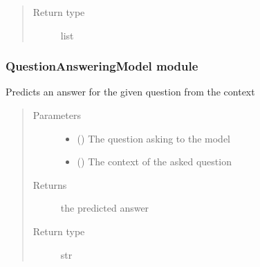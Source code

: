 \documentclass[letterpaper,10pt,english]{sphinxmanual}
\begin{document}
\begin{fulllineitems}
\begin{fulllineitems}
\begin{quote}
\begin{description}
\item[{Return type}] \leavevmode
\sphinxAtStartPar
list

\end{description}\end{quote}

\end{fulllineitems}


\end{fulllineitems}


\sphinxstepscope


\subsubsection{QuestionAnsweringModel module}
\label{\detokenize{QuestionAnsweringModel:module-QuestionAnsweringModel}}\label{\detokenize{QuestionAnsweringModel:questionansweringmodel-module}}\label{\detokenize{QuestionAnsweringModel::doc}}

\begin{fulllineitems}
\label{\detokenize{QuestionAnsweringModel:QuestionAnsweringModel.predict_answer}}
\pysigstartsignatures
{}
\pysigstopsignatures
\sphinxAtStartPar
Predicts an answer for the given question from the context
\begin{quote}\begin{description}
\item[{Parameters}] \leavevmode\begin{itemize}
\item {} 
\sphinxAtStartPar
{} () \textendash{} The question asking to the model

\item {} 
\sphinxAtStartPar
{} () \textendash{} The context of the asked question

\end{itemize}

\item[{Returns}] \leavevmode
\sphinxAtStartPar
the predicted answer

\item[{Return type}] \leavevmode
\sphinxAtStartPar
str

\end{description}\end{quote}

\end{fulllineitems}
\end{document}
